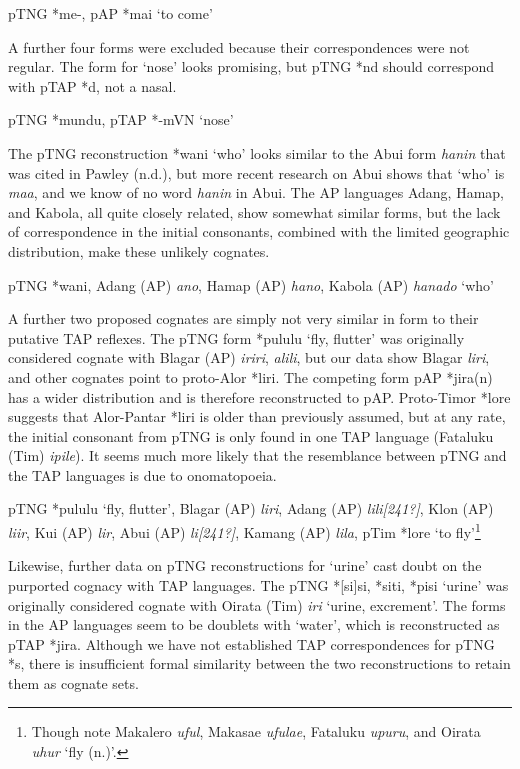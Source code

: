 \ea%
   pTNG *me-, pAP *mai `to come'
\z

A further four forms were excluded because their correspondences were not regular. The form for `nose' looks promising, but pTNG *nd should correspond with pTAP *d, not a nasal.

\ea%
   pTNG *mundu, pTAP *-mVN `nose'
\z

The pTNG reconstruction *wani `who' looks similar to the Abui form \textit{hanin} that was cited in Pawley (n.d.), but more recent research on Abui shows that `who' is \textit{maa}, and we know of  no word \textit{hanin} in Abui. The AP languages Adang, Hamap, and Kabola, all quite closely related, show somewhat similar forms, but the lack of correspondence in the initial consonants, combined with the limited geographic distribution, make these unlikely cognates.

\ea%
   pTNG *wani, Adang (AP) \textit{ano}, Hamap (AP) \textit{hano}, Kabola (AP) \textit{hanado} `who'
\z

A further two proposed cognates are simply not very similar in form to their putative TAP reflexes. The pTNG form *pululu `fly, flutter' was originally considered cognate with Blagar (AP) \textit{iriri}, \textit{alili}, but our data show Blagar \textit{liri}, and other cognates point to proto-Alor *liri. The competing form pAP *jira(n) has a wider distribution and is therefore reconstructed to pAP. Proto-Timor *lore suggests that Alor-Pantar *liri is older than previously assumed, but at any rate, the initial consonant from pTNG is only found in one TAP language (Fataluku (Tim) \textit{ipile}). It seems much more likely that the resemblance between pTNG and the TAP languages is due to onomatopoeia.

\ea%
   pTNG *pululu `fly, flutter', Blagar (AP) \textit{liri}, Adang (AP) \textit{lili}\textit{[241?]}, Klon (AP) \textit{liir}, Kui (AP) \textit{lir}, Abui (AP) \textit{li}\textit{[241?]}, Kamang (AP) \textit{lila}, pTim *lore `to fly'\footnote{Though note Makalero \textit{uful}, Makasae \textit{ufulae}, Fataluku \textit{upuru}, and Oirata \textit{uhur} `fly (n.)'. }
\z

Likewise, further data on pTNG reconstructions for `urine' cast doubt on the purported cognacy with TAP languages. The pTNG *[si]si, *siti, *pisi `urine' was originally considered cognate with Oirata (Tim) \textit{iri} `urine, excrement'. The forms in the AP languages seem to be doublets with `water', which is reconstructed as pTAP *jira. Although we have not established TAP correspondences for pTNG *s, there is insufficient formal similarity between the two reconstructions to retain them as cognate sets.

